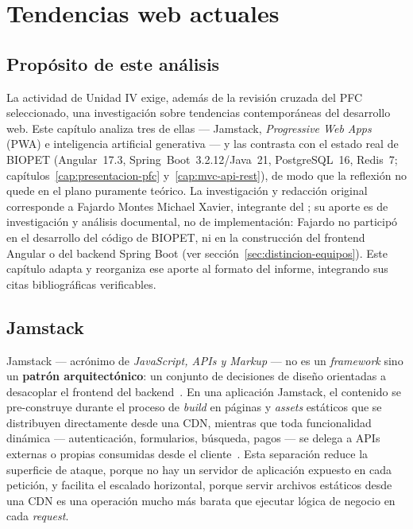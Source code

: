 \chapter{Tendencias web actuales}
\label{cap:tendencias-web}

\section{Prop\'osito de este an\'alisis}
\label{sec:tendencias-proposito}

La actividad de Unidad IV exige, adem\'as de la revisi\'on cruzada del PFC
seleccionado, una investigaci\'on sobre tendencias contempor\'aneas del
desarrollo web. Este cap\'itulo analiza tres de ellas --- Jamstack,
\emph{Progressive Web Apps} (PWA) e inteligencia artificial generativa ---
y las contrasta con el estado real de BIOPET (Angular~17.3,
Spring~Boot~3.2.12/Java~21, PostgreSQL~16, Redis~7;
cap\'itulos~\ref{cap:presentacion-pfc} y~\ref{cap:mvc-api-rest}), de modo que
la reflexi\'on no quede en el plano puramente te\'orico. La investigaci\'on y
redacci\'on original corresponde a Fajardo Montes Michael Xavier, integrante
del \equipoga; su aporte es de investigaci\'on y an\'alisis documental, no de
implementaci\'on: Fajardo no particip\'o en el desarrollo del c\'odigo de
BIOPET, ni en la construcci\'on del frontend Angular o del backend Spring
Boot (ver secci\'on~\ref{sec:distincion-equipos}). Este cap\'itulo adapta y
reorganiza ese aporte al formato del informe, integrando sus citas
bibliogr\'aficas verificables.

\section{Jamstack}
\label{sec:jamstack}

Jamstack --- acr\'onimo de \emph{JavaScript, APIs y Markup} --- no es un
\emph{framework} sino un \textbf{patr\'on arquitect\'onico}: un conjunto de
decisiones de dise\~no orientadas a desacoplar el frontend del
backend~\parencite{jamstack-org}. En una aplicaci\'on Jamstack, el contenido se
pre-construye durante el proceso de \emph{build} en p\'aginas y
\emph{assets} est\'aticos que se distribuyen directamente desde una CDN,
mientras que toda funcionalidad din\'amica --- autenticaci\'on, formularios,
b\'usqueda, pagos --- se delega a APIs externas o propias consumidas desde
el cliente~\parencite{cloudflare-jamstack}. Esta separaci\'on reduce la
superficie de ataque, porque no hay un servidor de aplicaci\'on expuesto en
cada petici\'on, y facilita el escalado horizontal, porque servir archivos
est\'aticos desde una CDN es una operaci\'on mucho m\'as barata que ejecutar
l\'ogica de negocio en cada \emph{request}.


